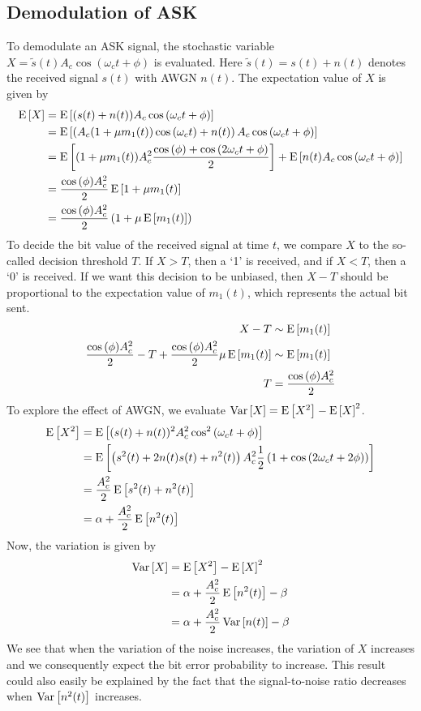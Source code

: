 \documentclass[11pt,titlepage]{report}
\begin{document}
\begin{appendices}
\subsection{Demodulation of ASK}
To demodulate an ASK signal, the stochastic variable $X=\widetilde{s}(t) A_c \cos{(\omega_c t + \phi)}$ is evaluated. Here $\widetilde{s}(t)=s(t)+n(t)$ denotes the received signal $s(t)$ with AWGN $n(t)$. The expectation value of $X$ is given by
\begin{align*}
	\operatorname{E}\left[X\right]&=\operatorname{E}\left[(s(t)+n(t)) A_c \cos{(\omega_c t + \phi)}\right] \\
	&=\operatorname{E}\left[\left(A_c (1+\mu m_1(t)) \cos{(\omega_c t)} + n(t)\right) A_c \cos{(\omega_c t + \phi)}\right] \\
	&= \operatorname{E}\left[(1+\mu m_1(t)) A_c^2 \frac{\cos{(\phi)} + \cos{(2 \omega_c t + \phi)}}{2}\right] + \operatorname{E}\left[n(t) A_c \cos{(\omega_c t + \phi)}\right] \\
	&= \frac{\cos{(\phi)} A_c^2}{2} \operatorname{E}\left[1+\mu m_1(t)\right] \\
	&= \frac{\cos{(\phi)} A_c^2}{2} \left( 1 + \mu \operatorname{E}\left[m_1(t)\right] \right)
\end{align*}
To decide the bit value of the received signal at time $t$, we compare $X$ to the so-called decision threshold $T$. If $X>T$, then a `1' is received, and if $X<T$, then a `0' is received. If we want this decision to be unbiased, then $X-T$ should be proportional to the expectation value of $m_1(t)$, which represents the actual bit sent.
\begin{align*}
	X - T &\sim \operatorname{E}\left[m_1(t)\right] \\
    \frac{\cos{(\phi)} A_c^2}{2} - T+ \frac{\cos{(\phi)} A_c^2}{2}  \mu \operatorname{E}\left[m_1(t)\right] &\sim \operatorname{E}\left[m_1(t)\right] \\
    T &= \frac{\cos{(\phi)} A_c^2}{2}
\end{align*}
To explore the effect of AWGN, we evaluate $\operatorname{Var}\left[X\right]=\operatorname{E}\left[X^2\right]-\operatorname{E}\left[X\right]^2$. 
\begin{align*}
	\operatorname{E}\left[X^2\right]&=\operatorname{E}\left[(s(t)+n(t))^2 A_c^2 \cos^2{(\omega_c t + \phi)}\right] \\
	&=\operatorname{E}\left[\left(s^2(t)+2n(t)s(t)+n^2(t)\right) A_c^2 \frac{1}{2} \left( 1+ \cos{(2\omega_c t + 2\phi)}\right)\right] \\
	&=\frac{A_c^2}{2}\operatorname{E}\left[s^2(t) + n^2(t)\right] \\
	&=\alpha + \frac{A_c^2}{2} \operatorname{E}\left[n^2(t)\right]
\end{align*}
Now, the variation is given by
\begin{align*}
	\operatorname{Var}\left[X\right] &= \operatorname{E}\left[X^2\right] - \operatorname{E}\left[X\right]^2 \\
	&= \alpha + \frac{A_c^2}{2} \operatorname{E}\left[n^2(t)\right] - \beta \\
	&= \alpha + \frac{A_c^2}{2} \operatorname{Var}\left[n(t)\right] - \beta
\end{align*}
We see that when the variation of the noise increases, the variation of $X$ increases and we consequently expect the bit error probability to increase. This result could also easily be explained by the fact that the signal-to-noise ratio decreases when $\operatorname{Var}\left[n^2(t)\right]$ increases.


\end{appendices}
\end{document}
